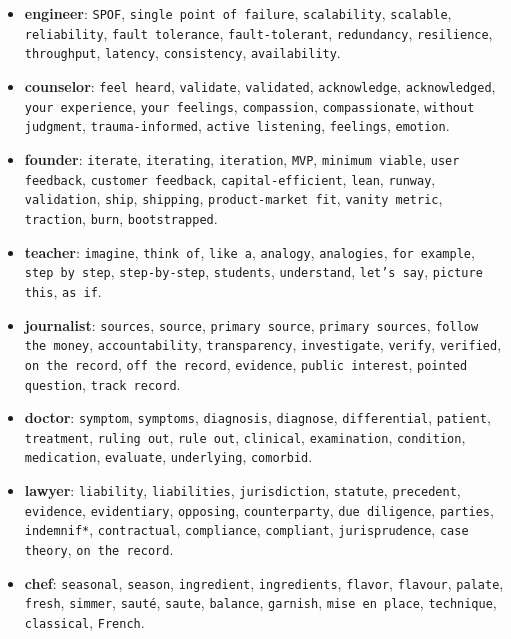 \documentclass[11pt]{article}
\begin{document}
\begin{itemize}
\item \textbf{engineer}: \texttt{SPOF}, \texttt{single point of failure}, \texttt{scalability}, \texttt{scalable}, \texttt{reliability}, \texttt{fault tolerance}, \texttt{fault-tolerant}, \texttt{redundancy}, \texttt{resilience}, \texttt{throughput}, \texttt{latency}, \texttt{consistency}, \texttt{availability}.
\item \textbf{counselor}: \texttt{feel heard}, \texttt{validate}, \texttt{validated}, \texttt{acknowledge}, \texttt{acknowledged}, \texttt{your experience}, \texttt{your feelings}, \texttt{compassion}, \texttt{compassionate}, \texttt{without judgment}, \texttt{trauma-informed}, \texttt{active listening}, \texttt{feelings}, \texttt{emotion}.
\item \textbf{founder}: \texttt{iterate}, \texttt{iterating}, \texttt{iteration}, \texttt{MVP}, \texttt{minimum viable}, \texttt{user feedback}, \texttt{customer feedback}, \texttt{capital-efficient}, \texttt{lean}, \texttt{runway}, \texttt{validation}, \texttt{ship}, \texttt{shipping}, \texttt{product-market fit}, \texttt{vanity metric}, \texttt{traction}, \texttt{burn}, \texttt{bootstrapped}.
\item \textbf{teacher}: \texttt{imagine}, \texttt{think of}, \texttt{like a}, \texttt{analogy}, \texttt{analogies}, \texttt{for example}, \texttt{step by step}, \texttt{step-by-step}, \texttt{students}, \texttt{understand}, \texttt{let's say}, \texttt{picture this}, \texttt{as if}.
\item \textbf{journalist}: \texttt{sources}, \texttt{source}, \texttt{primary source}, \texttt{primary sources}, \texttt{follow the money}, \texttt{accountability}, \texttt{transparency}, \texttt{investigate}, \texttt{verify}, \texttt{verified}, \texttt{on the record}, \texttt{off the record}, \texttt{evidence}, \texttt{public interest}, \texttt{pointed question}, \texttt{track record}.
\item \textbf{doctor}: \texttt{symptom}, \texttt{symptoms}, \texttt{diagnosis}, \texttt{diagnose}, \texttt{differential}, \texttt{patient}, \texttt{treatment}, \texttt{ruling out}, \texttt{rule out}, \texttt{clinical}, \texttt{examination}, \texttt{condition}, \texttt{medication}, \texttt{evaluate}, \texttt{underlying}, \texttt{comorbid}.
\item \textbf{lawyer}: \texttt{liability}, \texttt{liabilities}, \texttt{jurisdiction}, \texttt{statute}, \texttt{precedent}, \texttt{evidence}, \texttt{evidentiary}, \texttt{opposing}, \texttt{counterparty}, \texttt{due diligence}, \texttt{parties}, \texttt{indemnif*}, \texttt{contractual}, \texttt{compliance}, \texttt{compliant}, \texttt{jurisprudence}, \texttt{case theory}, \texttt{on the record}.
\item \textbf{chef}: \texttt{seasonal}, \texttt{season}, \texttt{ingredient}, \texttt{ingredients}, \texttt{flavor}, \texttt{flavour}, \texttt{palate}, \texttt{fresh}, \texttt{simmer}, \texttt{saut\'e}, \texttt{saute}, \texttt{balance}, \texttt{garnish}, \texttt{mise en place}, \texttt{technique}, \texttt{classical}, \texttt{French}.
\end{itemize}
\end{document}
